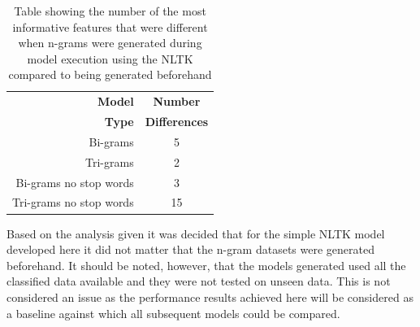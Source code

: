 \begin{table}[h]
\centering
\caption[Most informative feature comparison]{Table showing the number of the most informative features that were different when n-grams were generated during model execution using the NLTK compared to being generated beforehand}
\label{tab:chapter5:informative_features}
\begin{tabular}{rc}
	\toprule
    \textbf{Model} & \textbf{Number} \\
    \textbf{Type} & \textbf{Differences} \\
    \midrule
    Bi-grams & 5 \\
    Tri-grams & 2   \\
    Bi-grams no stop words & 3    \\
    Tri-grams no stop words & 15    \\
    \bottomrule
    \end{tabular}
\end{table}

Based on the analysis given it was decided that for the simple NLTK model developed here it did not matter that the n-gram datasets were generated beforehand. It should be noted, however, that the models generated used all the classified data available and they were not tested on unseen data. This is not considered an issue as the performance results achieved here will be considered as a baseline against which all subsequent models could be compared.